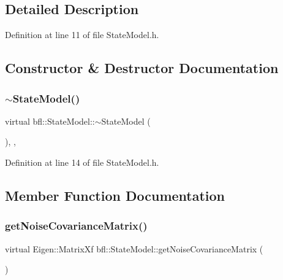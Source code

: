 \subsection{Detailed Description}


Definition at line 11 of file State\+Model.\+h.



\subsection{Constructor \& Destructor Documentation}
\mbox{\label{classbfl_1_1StateModel_ae07722f42306f297da2e55ce8cb0214a}} 
\subsubsection{\texorpdfstring{$\sim$\+State\+Model()}{~StateModel()}}
{\footnotesize\ttfamily virtual bfl\+::\+State\+Model\+::$\sim$\+State\+Model (\begin{DoxyParamCaption}{ }\end{DoxyParamCaption})\hspace{0.3cm}{\ttfamily [inline]}, {\ttfamily [virtual]}, {\ttfamily [noexcept]}}



Definition at line 14 of file State\+Model.\+h.



\subsection{Member Function Documentation}
\mbox{\label{classbfl_1_1StateModel_a606efee8bf37606833c1ac75f2fbb357}} 
\subsubsection{\texorpdfstring{get\+Noise\+Covariance\+Matrix()}{getNoiseCovarianceMatrix()}}
{\footnotesize\ttfamily virtual Eigen\+::\+Matrix\+Xf bfl\+::\+State\+Model\+::get\+Noise\+Covariance\+Matrix (\begin{DoxyParamCaption}{ }\end{DoxyParamCaption})\hspace{0.3cm}{\ttfamily [pure virtual]}}



